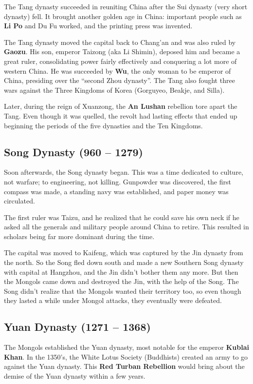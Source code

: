 The Tang dynasty succeeded in reuniting China after the Sui dynasty (very short dynasty) fell.
It brought another golden age in China:
important people such as \textbf{Li Po} and Du Fu worked,
and the printing press was invented.

The Tang dynasty moved the capital back to Chang'an and was also ruled by \textbf{Gaozu}.
His son, emperor Taizong (aka Li Shimin), deposed him and became a great ruler,
consolidating power fairly effectively and conquering a lot more of western China.
He was succeeded by \textbf{Wu}, the only woman to be emperor of China,
presiding over the ``second Zhou dynasty''.
The Tang also fought three wars against the Three Kingdoms of Korea (Gorguyeo, Beakje, and Silla).

Later, during the reign of Xuanzong, the \textbf{An Lushan} rebellion tore apart the Tang.
Even though it was quelled, the revolt had lasting effects that ended up beginning the
periods of the five dynasties and the Ten Kingdoms.

\subsection*{Song Dynasty (960 -- 1279)}

Soon afterwards, the Song dynasty began.
This was a time dedicated to culture, not warfare; to engineering, not killing.
Gunpowder was discovered, the first compass was made,
a standing navy was established, and paper money was circulated.

The first ruler was Taizu, and he realized that he could save his own neck if he
asked all the generals and military people around China to retire.
This resulted in scholars being far more dominant during the time.

The capital was moved to Kaifeng, which was captured by the Jin dynasty from the north.
So the Song fled down south and made a new Southern Song dynasty with capital at Hangzhou,
and the Jin didn't bother them any more.
But then the Mongols came down and destroyed the Jin, with the help of the Song.
The Song didn't realize that the Mongols wanted their territory too,
so even though they lasted a while under Mongol attacks, they eventually were defeated.

\subsection*{Yuan Dynasty (1271 -- 1368)}

The Mongols established the Yuan dynasty, most notable for the emperor \textbf{Kublai Khan}.
In the 1350's, the White Lotus Society (Buddhists) created an army to go against the Yuan dynasty.
This \textbf{Red Turban Rebellion} would bring about the demise of the Yuan dynasty within a few years.

